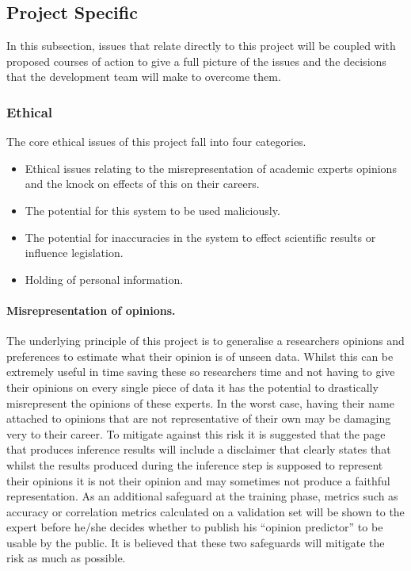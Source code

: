 \documentclass[11pt]{article} %
\numberwithin{equation}{section}
\begin{document}
\subsection{Project Specific}

In this subsection, issues that relate directly to this project will
be coupled with proposed courses of action to give a full picture
of the issues and the decisions that the development team will make
to overcome them. 

\subsubsection{Ethical}

The core ethical issues of this project fall into four categories. 
\begin{itemize}
\item Ethical issues relating to the misrepresentation of academic experts
opinions and the knock on effects of this on their careers.
\item The potential for this system to be used maliciously.
\item The potential for inaccuracies in the system to effect scientific
results or influence legislation. 
\item Holding of personal information.
\end{itemize}

\paragraph{Misrepresentation of opinions.}

The underlying principle of this project is to generalise a researchers
opinions and preferences to estimate what their opinion is of unseen
data. Whilst this can be extremely useful in time saving these so
researchers time and not having to give their opinions on every single
piece of data it has the potential to drastically misrepresent the
opinions of these experts. In the worst case, having their name attached
to opinions that are not representative of their own may be damaging
very to their career. To mitigate against this risk it is suggested
that the page that produces inference results will include a disclaimer
that clearly states that whilst the results produced during the inference
step is supposed to represent their opinions it is not their opinion
and may sometimes not produce a faithful representation. As an additional
safeguard at the training phase, metrics such as accuracy or correlation
metrics calculated on a validation set will be shown to the expert
before he/she decides whether to publish his ``opinion predictor''
to be usable by the public. It is believed that these two safeguards
will mitigate the risk as much as possible. 
\end{document}

